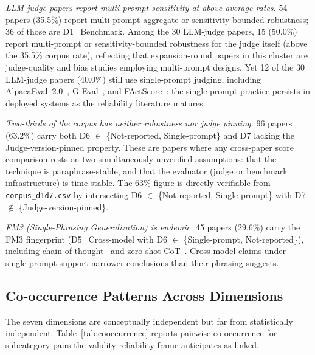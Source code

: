 \documentclass[acmsmall, nonacm, screen]{acmart}
\begin{document}
\textit{LLM-judge papers report multi-prompt sensitivity at
above-average rates.} 54 papers (35.5\%) report multi-prompt
aggregate or sensitivity-bounded robustness; 36 of those are
D1=Benchmark. Among the 30 LLM-judge papers, 15 (50.0\%) report
multi-prompt or sensitivity-bounded robustness for the judge itself
(above the 35.5\% corpus rate), reflecting that expansion-round
papers in this cluster are judge-quality and bias studies employing
multi-prompt designs. Yet 12 of the 30 LLM-judge papers (40.0\%)
still use single-prompt judging, including
AlpacaEval~2.0~\cite{dubois2024alpacaeval},
G-Eval~\cite{liu2023geval}, and
FActScore~\cite{factscore2023}: the single-prompt practice persists
in deployed systems as the reliability literature matures.

\textit{Two-thirds of the corpus has neither robustness nor judge
pinning.} 96 papers (63.2\%) carry both D6 $\in$ \{Not-reported,
Single-prompt\} and D7 lacking the Judge-version-pinned property.
These are papers where any cross-paper score comparison rests on
two simultaneously unverified assumptions: that the technique is
paraphrase-stable, and that the evaluator (judge or benchmark
infrastructure) is time-stable. The 63\% figure is directly verifiable from \texttt{corpus\_d1d7.csv}
by intersecting D6 $\in$ \{Not-reported, Single-prompt\} with
D7 $\notin$ \{Judge-version-pinned\}.

\textit{FM3 (Single-Phrasing Generalization) is endemic.}
45 papers (29.6\%) carry the FM3 fingerprint (D5=Cross-model with
D6 $\in$ \{Single-prompt, Not-reported\}), including
chain-of-thought~\cite{wei2022chain} and zero-shot
CoT~\cite{kojima2022large}. Cross-model claims under single-prompt
support narrower conclusions than their phrasing suggests.

\subsection{Co-occurrence Patterns Across Dimensions}
\label{subsec:cooccurrence}

The seven dimensions are conceptually independent but far from
statistically independent. Table~\ref{tab:cooccurrence} reports
pairwise co-occurrence for subcategory pairs the
validity-reliability frame anticipates as linked.
\end{document}
